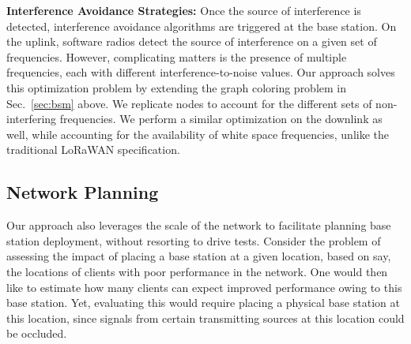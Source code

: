 \noindent \textbf{Interference Avoidance Strategies: } Once the source of interference is detected, interference avoidance algorithms are triggered at the base station. On the uplink, software radios detect the source of interference on a given set of frequencies. However, complicating matters is the presence of multiple frequencies, each with different interference-to-noise values. Our approach solves this optimization problem by extending the graph coloring problem in Sec.~\ref{sec:bsm} above. We replicate nodes to account for the different sets of non-interfering frequencies. We perform a similar optimization on the downlink as well, while accounting for the availability of white space frequencies, unlike the traditional LoRaWAN specification. 





\subsection{Network Planning}
Our approach also leverages the scale of the network to facilitate planning base station deployment, without resorting to drive tests. Consider the problem of assessing the impact of placing a base station at a given location, based on say, the locations of clients with poor performance in the network. One would then like to estimate how many clients can expect improved performance owing to this base station. Yet, evaluating this would require placing a physical base station at this location, since signals from certain transmitting sources at this location could be occluded. 

